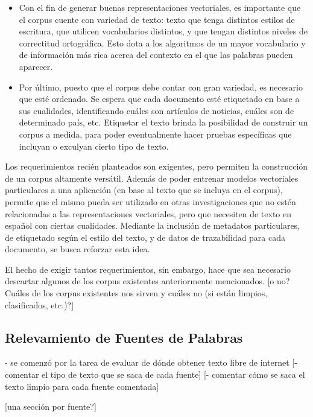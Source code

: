 \begin{itemize}
\item Con el fin de generar buenas representaciones vectoriales, es importante que el corpus cuente
con variedad de texto: texto que tenga distintos estilos de escritura, que utilicen vocabularios
distintos, y que tengan distintos niveles de correctitud ortográfica. Esto dota a los algoritmos de
un mayor vocabulario y de información más rica acerca del contexto en el que las palabras pueden
aparecer.

\item Por último, puesto que el corpus debe contar con gran variedad, es necesario que esté
ordenado. Se espera que cada documento esté etiquetado en base a sus cualidades, identificando
cuáles son artículos de noticias, cuáles son de determinado país, etc. Etiquetar el texto brinda la
posibilidad de construir un corpus a medida, para poder eventualmente hacer pruebas específicas que
incluyan o exculyan cierto tipo de texto.

\end{itemize}

Los requerimientos recién planteados son exigentes, pero permiten la construcción de un corpus
altamente versátil. Además de poder entrenar modelos vectoriales particulares a una aplicación (en
base al texto que se incluya en el corpus), permite que el mismo pueda ser utilizado en otras
investigaciones que no estén relacionadas a las representaciones vectoriales, pero que necesiten de
texto en español con ciertas cualidades. Mediante la inclusión de metadatos particulares, de
etiquetado según el estilo del texto, y de datos de trazabilidad para cada documento, se busca
reforzar esta idea.

El hecho de exigir tantos requerimientos, sin embargo, hace que sea necesario descartar algunos de
los corpus existentes anteriormente mencionados. [o no? Cuáles de los corpus existentes nos sirven y
cuáles no (si están limpios, clasificados, etc.)?]


\subsection{Relevamiento de Fuentes de Palabras}

- se comenzó por la tarea de evaluar de dónde obtener texto libre de internet
[- comentar el tipo de texto que se saca de cada fuente]
[- comentar cómo se saca el texto limpio para cada fuente comentada]

[una sección por fuente?]

